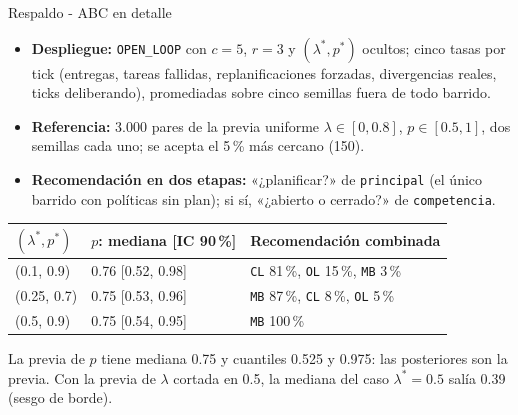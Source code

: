 \documentclass[aspectratio=169]{beamer}
\newcommand{\pol}[1]{\texttt{#1}}
\newcommand{\OL}{\pol{OPEN\_LOOP}}
\newcommand{\nota}[1]{{\footnotesize\color{mcmBlack!65}#1\par}}
\begin{document}
\begin{frame}{Respaldo - ABC en detalle}
  \small
  \begin{itemize}
    \item \textbf{Despliegue:} \OL{} con $c=5$, $r=3$ y $(\lambda^{*},p^{*})$
      ocultos; cinco tasas por tick (entregas, tareas fallidas,
      replanificaciones forzadas, divergencias reales, ticks deliberando),
      promediadas sobre cinco semillas fuera de todo barrido.
    \item \textbf{Referencia:} 3.000 pares de la previa uniforme
      $\lambda\in[0,0.8]$, $p\in[0.5,1]$, dos semillas cada uno; se acepta el
      5\,\% más cercano (150).
    \item \textbf{Recomendación en dos etapas:} «¿planificar?» de
      \texttt{principal} (el único barrido con políticas sin plan); si sí,
      «¿abierto o cerrado?» de \texttt{competencia}.
  \end{itemize}
  \vspace{0.3em}
  \centering\footnotesize
  \begin{tabular}{@{}l l l@{}}
    \toprule
    $(\lambda^{*},p^{*})$ & $p$: mediana [IC 90\,\%] & Recomendación combinada \\
    \midrule
    (0.1, 0.9)  & 0.76 [0.52, 0.98] & \texttt{CL} 81\,\%, \texttt{OL} 15\,\%, \texttt{MB} 3\,\% \\
    (0.25, 0.7) & 0.75 [0.53, 0.96] & \texttt{MB} 87\,\%, \texttt{CL} 8\,\%, \texttt{OL} 5\,\% \\
    (0.5, 0.9)  & 0.75 [0.54, 0.95] & \texttt{MB} 100\,\% \\
    \bottomrule
  \end{tabular}

  \nota{La previa de $p$ tiene mediana 0.75 y cuantiles 0.525 y 0.975: las
  posteriores son la previa. Con la previa de $\lambda$ cortada en 0.5, la
  mediana del caso $\lambda^{*}=0.5$ salía 0.39 (sesgo de borde).}
\end{frame}
\end{document}
